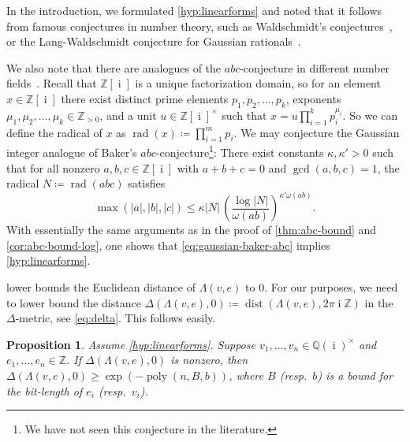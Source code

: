 \documentclass[10pt,a4paper]{article}
\newtheorem{proposition}[theorem]{Proposition}
\theoremstyle{definition}
\DeclareMathOperator{\poly}{poly}
\DeclareMathOperator{\rad}{rad}
\DeclareMathOperator{\ii}{i}
\DeclareMathOperator{\dist}{dist}
\newcommand{\QQ}{\mathbb{Q}}
\newcommand{\ZZ}{\mathbb{Z}}
\numberwithin{equation}{section}
\begin{document}
In the introduction, we formulated \cref{hyp:linearforms} and noted that it follows
from famous conjectures in number theory, such as
Waldschmidt's conjectures~\cite[Conjecture~14.25]{waldschmidt-2},~\cite[Conjecture~4.14]{waldschmidt-1}
or the Lang-Waldschmidt conjecture
for Gaussian rationals~\cite[Introduction to Chapters X and XI]{lang-elliptic-curves}.

We also note that there are analogues of the $abc$-conjecture in different number fields~\cite{bombieri_gubler_2006}.
Recall that $\ZZ[\ii]$ is a unique factorization domain,
so for an element $x\in\ZZ[\ii]$
there exist distinct prime elements $p_1,p_2,\dots,p_k$,
exponents $\mu_1,\mu_2,\dots,\mu_k\in\ZZ_{>0}$,
and a unit $u\in\ZZ[\ii]^\times$ such that
$x = u \prod_{i=1}^k p_i^{\mu_i}$.
So we can define the radical of $x$ as $\rad(x)\coloneqq \prod_{i=1}^m p_i$.
We may conjecture the Gaussian integer analogue of Baker's $abc$-conjecture\footnote{We have not seen this conjecture in the literature.}:
There exist constants $\kappa,\kappa'>0$ such that for all nonzero
$a,b,c\in\ZZ[\ii]$ with $a+b+c=0$ and $\gcd(a,b,c)=1$,
the radical $N\coloneqq\rad(abc)$ satisfies
\begin{equation}\label{eq:gaussian-baker-abc}
	\max (|a|, |b|, |c|) \leq \kappa |N| \, \left(\frac{\log |N|}{\omega(ab)}\right)^{\kappa' \omega(ab)}.
\end{equation}
With essentially the same arguments as in the proof of \cref{thm:abc-bound}
and \cref{cor:abc-bound-log},
one shows that \cref{eq:gaussian-baker-abc}
implies \cref{hyp:linearforms}.

 lower bounds the Euclidean distance of $\Lambda(v,e)$ to $0$.
For our purposes, we need to lower bound the distance
$\Delta( \Lambda(v,e) , 0 )\coloneqq \dist( \Lambda(v,e), 2\pi\ii\ZZ )$
in the $\Delta$-metric, see \cref{eq:delta}.
This follows easily.

\begin{proposition}
\label{cor:hyp-in-delta-metric}
Assume \cref{hyp:linearforms}.
Suppose $v_1,\dots,v_n\in\QQ(\ii)^\times$
and $e_1,\dots,e_n\in\ZZ$.
If $\Delta( \Lambda(v,e),0)$ is nonzero, then
$\Delta( \Lambda(v,e) , 0 ) \geq \exp(-\poly(n,B,b))$,
where $B$ (resp.~$b$) is a bound for the bit-length of $e_i$ (resp.~$v_i$).
\end{proposition}
\end{document}
